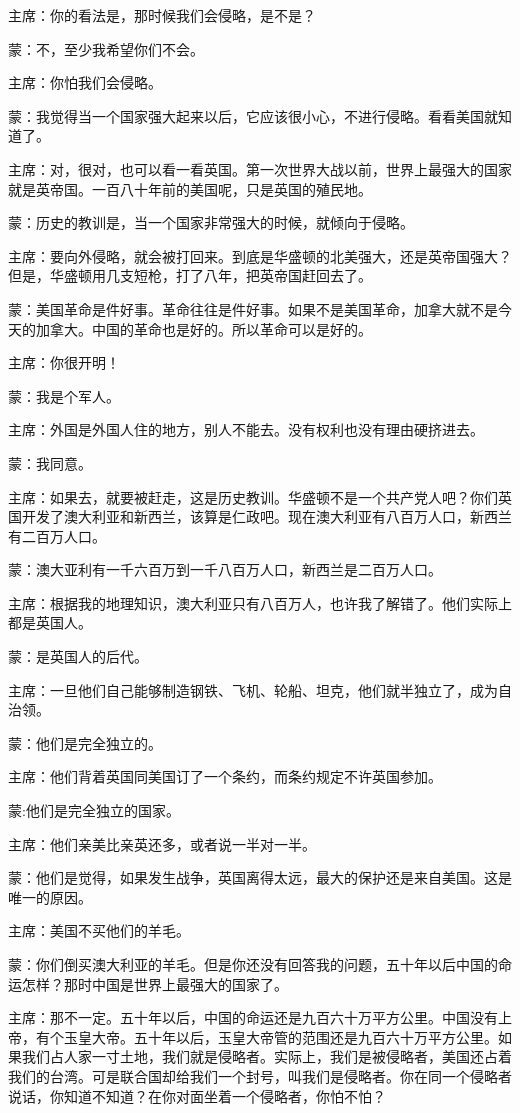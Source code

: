 主席：你的看法是，那时候我们会侵略，是不是？

蒙：不，至少我希望你们不会。

主席：你怕我们会侵略。

蒙：我觉得当一个国家强大起来以后，它应该很小心，不进行侵略。看看美国就知道了。

主席：对，很对，也可以看一看英国。第一次世界大战以前，世界上最强大的国家就是英帝国。一百八十年前的美国呢，只是英国的殖民地。

蒙：历史的教训是，当一个国家非常强大的时候，就倾向于侵略。

主席：要向外侵略，就会被打回来。到底是华盛顿的北美强大，还是英帝国强大？但是，华盛顿用几支短枪，打了八年，把英帝国赶回去了。

蒙：美国革命是件好事。革命往往是件好事。如果不是美国革命，加拿大就不是今天的加拿大。中国的革命也是好的。所以革命可以是好的。

主席：你很开明！

蒙：我是个军人。

主席：外国是外国人住的地方，别人不能去。没有权利也没有理由硬挤进去。

蒙：我同意。

主席：如果去，就要被赶走，这是历史教训。华盛顿不是一个共产党人吧？你们英国开发了澳大利亚和新西兰，该算是仁政吧。现在澳大利亚有八百万人口，新西兰有二百万人口。

蒙：澳大亚利有一千六百万到一千八百万人口，新西兰是二百万人口。

主席：根据我的地理知识，澳大利亚只有八百万人，也许我了解错了。他们实际上都是英国人。

蒙：是英国人的后代。

主席：一旦他们自己能够制造钢铁、飞机、轮船、坦克，他们就半独立了，成为自治领。

蒙：他们是完全独立的。

主席：他们背着英国同美国订了一个条约，而条约规定不许英国参加。

蒙:他们是完全独立的国家。

主席：他们亲美比亲英还多，或者说一半对一半。

蒙：他们是觉得，如果发生战争，英国离得太远，最大的保护还是来自美国。这是唯一的原因。

主席：美国不买他们的羊毛。

蒙：你们倒买澳大利亚的羊毛。但是你还没有回答我的问题，五十年以后中国的命运怎样？那时中国是世界上最强大的国家了。

主席：那不一定。五十年以后，中国的命运还是九百六十万平方公里。中国没有上帝，有个玉皇大帝。五十年以后，玉皇大帝管的范围还是九百六十万平方公里。如果我们占人家一寸土地，我们就是侵略者。实际上，我们是被侵略者，美国还占着我们的台湾。可是联合国却给我们一个封号，叫我们是侵略者。你在同一个侵略者说话，你知道不知道？在你对面坐着一个侵略者，你怕不怕？

